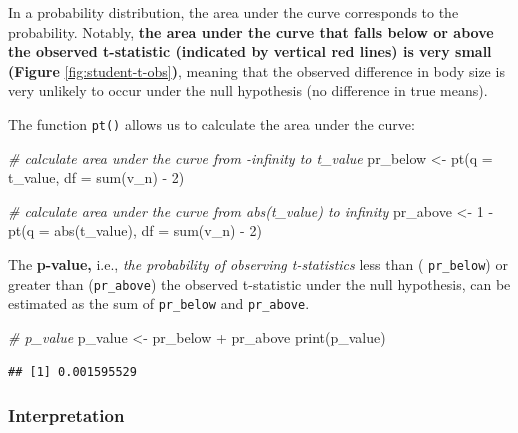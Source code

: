 \documentclass[
]{article}
\newenvironment{Shaded}{\begin{snugshade}}{\end{snugshade}}
\newcommand{\AttributeTok}[1]{\textcolor[rgb]{0.77,0.63,0.00}{#1}}
\newcommand{\CommentTok}[1]{\textcolor[rgb]{0.56,0.35,0.01}{\textit{#1}}}
\newcommand{\DecValTok}[1]{\textcolor[rgb]{0.00,0.00,0.81}{#1}}
\newcommand{\FunctionTok}[1]{\textcolor[rgb]{0.00,0.00,0.00}{#1}}
\newcommand{\NormalTok}[1]{#1}
\newcommand{\OtherTok}[1]{\textcolor[rgb]{0.56,0.35,0.01}{#1}}
\newcommand{\SpecialCharTok}[1]{\textcolor[rgb]{0.00,0.00,0.00}{#1}}
\begin{document}
In a probability distribution, the area under the curve corresponds to the probability. Notably, \textbf{the area under the curve that falls below or above the observed t-statistic (indicated by vertical red lines) is very small (Figure} \ref{fig:student-t-obs}\textbf{)}, meaning that the observed difference in body size is very unlikely to occur under the null hypothesis (no difference in true means).

The function \texttt{pt()} allows us to calculate the area under the curve:

\begin{Shaded}
\begin{Highlighting}[]
\CommentTok{\# calculate area under the curve from {-}infinity to t\_value}
\NormalTok{pr\_below }\OtherTok{\textless{}{-}} \FunctionTok{pt}\NormalTok{(}\AttributeTok{q =}\NormalTok{ t\_value, }\AttributeTok{df =} \FunctionTok{sum}\NormalTok{(v\_n) }\SpecialCharTok{{-}} \DecValTok{2}\NormalTok{)}

\CommentTok{\# calculate area under the curve from abs(t\_value) to infinity}
\NormalTok{pr\_above }\OtherTok{\textless{}{-}} \DecValTok{1} \SpecialCharTok{{-}} \FunctionTok{pt}\NormalTok{(}\AttributeTok{q =} \FunctionTok{abs}\NormalTok{(t\_value), }\AttributeTok{df =} \FunctionTok{sum}\NormalTok{(v\_n) }\SpecialCharTok{{-}} \DecValTok{2}\NormalTok{)}
\end{Highlighting}
\end{Shaded}

The \textbf{p-value,} i.e., \emph{the probability of observing t-statistics} less than ( \texttt{pr\_below}) or greater than (\texttt{pr\_above}) the observed t-statistic under the null hypothesis, can be estimated as the sum of \texttt{pr\_below} and \texttt{pr\_above}.

\begin{Shaded}
\begin{Highlighting}[]
\CommentTok{\# p\_value}
\NormalTok{p\_value }\OtherTok{\textless{}{-}}\NormalTok{ pr\_below }\SpecialCharTok{+}\NormalTok{ pr\_above}
\FunctionTok{print}\NormalTok{(p\_value)}
\end{Highlighting}
\end{Shaded}

\begin{verbatim}
## [1] 0.001595529
\end{verbatim}

\hypertarget{interpretation}{%
\subsubsection{Interpretation}\label{interpretation}}
\end{document}
